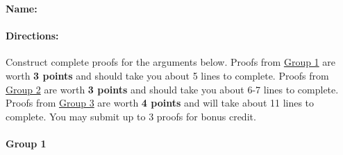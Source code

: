 \documentclass[10pt]{article}
\begin{document}
\small

\textbf{Name:}\underline{\hspace{2in}}

\paragraph{Directions:} Construct complete proofs for the arguments below. Proofs from \underline{Group 1} are worth \textbf{3 points} and should take you about 5 lines to complete. Proofs from \underline{Group 2} are worth \textbf{3 points} and should take you about 6-7 lines to complete.  Proofs from \underline{Group 3} are worth \textbf{4 points} and will take about 11 lines to complete. You may submit up to 3 proofs for bonus credit.

\paragraph{Group 1}
\end{document}
